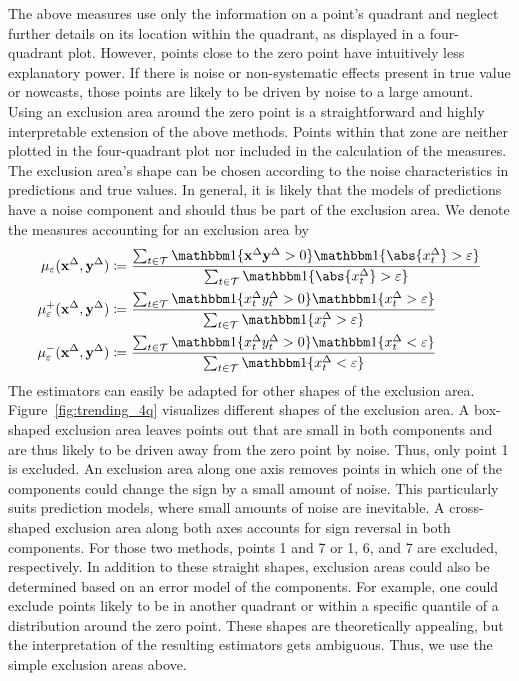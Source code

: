 The above measures use only the information on a point's quadrant and neglect further details on its location within the quadrant, as displayed in a four-quadrant plot.
However, points close to the zero point have intuitively less explanatory power.
If there is noise or non-systematic effects present in true value or nowcasts, those points are likely to be driven by noise to a large amount. 
Using an exclusion area around the zero point is a straightforward and highly interpretable extension of the above methods.
Points within that zone are neither plotted in the four-quadrant plot nor included in the calculation of the measures.
The exclusion area's shape can be chosen according to the noise characteristics in predictions and true values.
In general, it is likely that the models of predictions have a noise component and should thus be part of the exclusion area.
We denote the measures accounting for an exclusion area by
\begin{align}
    \acceps (\diffx, \diffy) &\coloneqq \frac{\sum_{t \in \mathcal{T}} \ind{\diffx \diffy > 0} \ind{\abs{\diffxt} > \varepsilon}}{\sum_{t \in \mathcal{T}} \ind{\abs{\diffxt} > \varepsilon}}\label{eq:acceps}\\
    \accpeps (\diffx, \diffy) &\coloneqq \frac{\sum_{t \in \mathcal{T}} \ind{\diffxt \diffyt > 0} \ind{\diffxt > \varepsilon}}{\sum_{t \in \mathcal{T}} \ind{\diffxt > \varepsilon}} \label{eq:accpeps}\\
    \accmeps (\diffx, \diffy) &\coloneqq \frac{\sum_{t \in \mathcal{T}} \ind{\diffxt \diffyt > 0} \ind{\diffxt < \varepsilon}}{\sum_{t \in \mathcal{T}} \ind{\diffxt < \varepsilon }}\label{eq:accmeps}
\end{align}
The estimators can easily be adapted for other shapes of the exclusion area.
Figure~\ref{fig:trending_4q} visualizes different shapes of the exclusion area.
A box-shaped exclusion area leaves points out that are small in both components and are thus likely to be driven away from the zero point by noise.
Thus, only point 1 is excluded.
An exclusion area along one axis removes points in which one of the components could change the sign by a small amount of noise.
This particularly suits prediction models, where small amounts of noise are inevitable.
A cross-shaped exclusion area along both axes accounts for sign reversal in both components.
For those two methods, points 1 and 7 or 1, 6, and 7 are excluded, respectively.
In addition to these straight shapes, exclusion areas could also be determined based on an error model of the components.
For example, one could exclude points likely to be in another quadrant or within a specific quantile of a distribution around the zero point. \unsure{}
These shapes are theoretically appealing, but the interpretation of the resulting estimators gets ambiguous.
Thus, we use the simple exclusion areas above.

